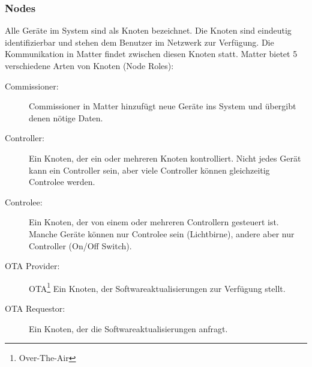 \documentclass[12pt, a4paper]{article}
\begin{document}
\subsubsection{Nodes}
\par Alle Geräte im System sind als Knoten bezeichnet. Die Knoten sind eindeutig identifizierbar und stehen dem Benutzer im Netzwerk zur Verfügung. Die Kommunikation in Matter findet zwischen diesen Knoten statt. Matter bietet 5 verschiedene Arten von Knoten (Node Roles):
\begin{description} 
  \item [Commissioner:] Commissioner in Matter hinzufügt neue Geräte ins System und übergibt denen nötige Daten.
  \item [Controller:] Ein Knoten, der ein oder mehreren Knoten kontrolliert. Nicht jedes Gerät kann ein Controller sein, aber viele Controller können gleichzeitig Controlee werden.
  \item [Controlee:] Ein Knoten, der von einem oder mehreren Controllern gesteuert ist. Manche Geräte können nur Controlee sein (Lichtbirne), andere aber nur Controller (On/Off Switch).
  \item [OTA Provider:] OTA\footnote[7]{Over-The-Air} Ein Knoten, der Softwareaktualisierungen zur Verfügung stellt.
  \item [OTA Requestor:] Ein Knoten, der die Softwareaktualisierungen anfragt.
\end{description}
\end{document}
